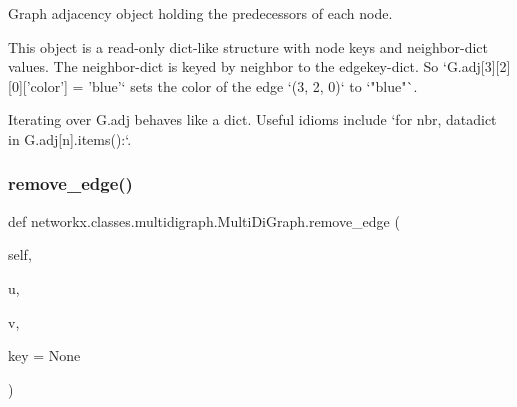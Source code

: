 \begin{DoxyVerb}Graph adjacency object holding the predecessors of each node.

This object is a read-only dict-like structure with node keys
and neighbor-dict values.  The neighbor-dict is keyed by neighbor
to the edgekey-dict.  So `G.adj[3][2][0]['color'] = 'blue'` sets
the color of the edge `(3, 2, 0)` to `"blue"`.

Iterating over G.adj behaves like a dict. Useful idioms include
`for nbr, datadict in G.adj[n].items():`.
\end{DoxyVerb}
 \mbox{\label{classnetworkx_1_1classes_1_1multidigraph_1_1MultiDiGraph_a843fdbf2ba1f538d53a98d44d3449464}} 
\subsubsection{\texorpdfstring{remove\+\_\+edge()}{remove\_edge()}}
{\footnotesize\ttfamily def networkx.\+classes.\+multidigraph.\+Multi\+Di\+Graph.\+remove\+\_\+edge (\begin{DoxyParamCaption}\item[{}]{self,  }\item[{}]{u,  }\item[{}]{v,  }\item[{}]{key = {\ttfamily None} }\end{DoxyParamCaption})}

